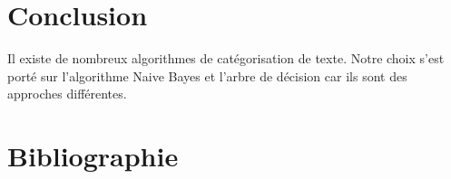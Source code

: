 \section*{Conclusion}

Il existe de nombreux algorithmes de catégorisation de texte. Notre choix s'est porté sur l'algorithme Naive Bayes et l'arbre de décision car ils sont des approches différentes. 
\newpage

\section*{Bibliographie}

\begin{thebibliography}{99}


\end{thebibliography}
